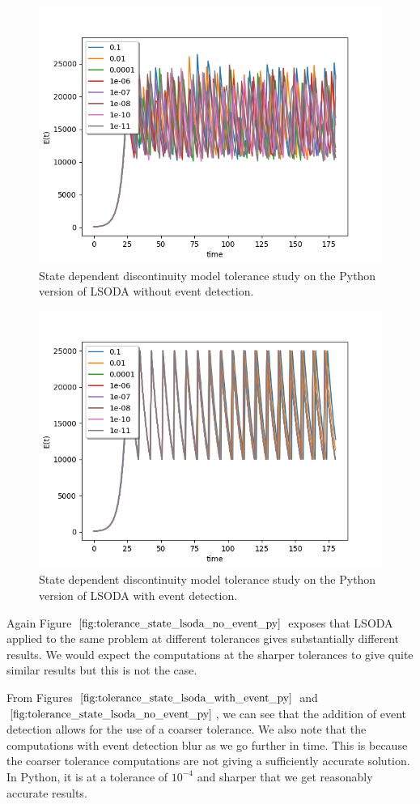 \begin{figure}[h]
\centering
\includegraphics[width=0.7\linewidth]{./figures/tolerance_state_lsoda_no_event_py}
\caption{State dependent discontinuity model tolerance study on the Python version of LSODA without event detection.}
\label{fig:tolerance_state_lsoda_no_event_py}
\end{figure}

\begin{figure}[h]
\centering
\includegraphics[width=0.7\linewidth]{./figures/tolerance_state_lsoda_with_event_py}
\caption{State dependent discontinuity model tolerance study on the Python version of LSODA with event detection.}
\label{fig:tolerance_state_lsoda_with_event_py}
\end{figure}

Again Figure $\ref{fig:tolerance_state_lsoda_no_event_py}$ exposes that LSODA applied to the same problem at different tolerances gives substantially different results. We would expect the computations at the sharper tolerances to give quite similar results but this is not the case.

From Figures $\ref{fig:tolerance_state_lsoda_with_event_py}$ and $\ref{fig:tolerance_state_lsoda_no_event_py}$, we can see that the addition of event detection allows for the use of a coarser tolerance. We also note that the computations with event detection blur as we go further in time. This is because the coarser tolerance computations are not giving a sufficiently accurate solution. In Python, it is at a tolerance of $10^{-4}$ and sharper that we get reasonably accurate results. 

